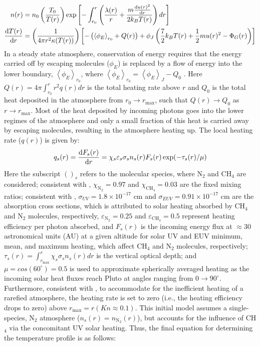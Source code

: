 \documentclass[times,12]{article}
\begin{document}
\begin{align}
n(r) &= n_0 \left(\frac{T_0}{T(r)}\right) \exp \left[ - \int_{r_0}^r \left( \frac{\lambda(r)}{r} + \frac{m \dv{u(r)^2}{r} }{2 k_B T(r)}\right)dr \right] \label{eq:numdens}\\
\dv{T(r)}{r} &= \left( \frac{1}{4 \pi r^2 \kappa(T(r))} \right) \left[ - \left( \left\langle \phi_E \right\rangle_{r_0} + Q(r)\right) + \phi_J \left( \frac{7}{2} k_B T(r) + \frac{1}{2}m u(r)^2 - \Phi_G(r) \right) \right]
\end{align}
\noindent In a steady state atmosphere, conservation of energy requires that the energy carried off by escaping molecules ($\phi_E$) is replaced by a flow of energy into the lower boundary, $\left\langle \phi_E \right\rangle_{r_0}$, where $\left\langle \phi_E \right\rangle_{r_0} = \left\langle \phi_E \right\rangle_J  - Q_0$ \citep{Tucker2012}. Here $Q(r) = 4 \pi \int_{r_0}^r r^2 q(r) dr$ is the total heating rate above $r$ and $Q_0$ is the total heat deposited in the atmosphere from $r_0 \rightarrow r_{\mathrm{max}}$, such that $Q(r) \rightarrow Q_0$ as $r \rightarrow r_{\mathrm{max}}$. Most of the heat deposited by incoming photons goes into the lower regimes of the atmosphere and only a small fraction of this heat is carried away by escaping molecules, resulting in the atmosphere heating up. The local heating rate ($q(r)$) is given by:
\begin{align}
q_s(r) = \dv{F_s(r)}{r} = \chi_s \varepsilon_s \sigma_s n_s(r) F_s(r) \exp(-\tau_s(r) / \mu)
\end{align}
\noindent Here the subscript $()_s$ refers to the molecular species, where N$_2$ and CH$_4$ are considered; consistent with \cite{Strobel2008}, $\chi_{\mathrm{N}_2} = 0.97$ and $\chi_{\mathrm{CH}_4}=0.03$ are the fixed mixing ratios; consistent with \cite{Krasnopolsky1999}, $\sigma_{UV} = 1.8 \times 10^{-17}$ cm and $\sigma_{EUV} = 0.91 \times 10^{-17}$ cm are the absorption cross sections, which is attributed to solar heating absorbed by CH$_4$ and N$_2$ molecules, respectively, $\varepsilon_{\mathrm{N}_2} = 0.25$ and $\varepsilon_{\mathrm{CH}_4} = 0.5$ represent heating efficiency per photon absorbed, and $F_s(r)$ is the incoming energy flux at $\approx30$ astronomical units (AU) at a given altitude for solar UV and EUV minimum, mean, and maximum heating, which affect CH$_4$ and N$_2$ molecules, respectively; $\tau_s(r) = \int_{r_{\mathrm{max}}}^r \chi_s \sigma_s n_s(r) dr$ is the vertical optical depth; and $\mu = cos(60^{\circ}) = 0.5$ is used to approximate spherically averaged heating as the incoming solar heat fluxes reach Pluto at angles ranging from $0\rightarrow90^{\circ}$. Furthermore, consistent with \cite{Erwin2013}, to accommodate for the inefficient heating of a rarefied atmosphere, the heating rate is set to zero (i.e., the heating efficiency drops to zero) above $r_{\mathrm{max}}=r(Kn \approx 0.1)$. This initial model assumes a single-species, N$_2$ atmosphere ($n_s(r) = n_{\mathrm{N}_2}(r)$), but accounts for the influence of CH$_4$ via the concomitant UV solar heating. Thus, the final equation for determining the temperature profile is as follows:
\end{document}
